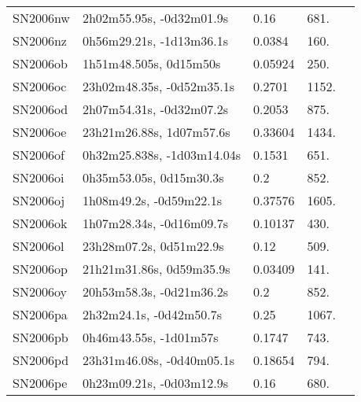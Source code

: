 \begin{longtable}{lllll}
         SN2006nw &       2h02m55.95s, -0d32m01.9s &     0.16 &           681. &    \citet{2006CBET..743A...1B} \\
         SN2006nz &       0h56m29.21s, -1d13m36.1s &   0.0384 &           160. &  \citet{2009AandA...495..707C} \\
         SN2006ob &         1h51m48.505s, 0d15m50s &  0.05924 &           250. &    \citet{2003SDSS1.C...0000:} \\
         SN2006oc &      23h02m48.35s, -0d52m35.1s &   0.2701 &          1152. &    \citet{2011ApJ...740...92G} \\
         SN2006od &       2h07m54.31s, -0d32m07.2s &   0.2053 &           875. &    \citet{2011ApJ...740...92G} \\
         SN2006oe &       23h21m26.88s, 1d07m57.6s &  0.33604 &          1434. &    \citet{2016SDSSD.C...0000:} \\
         SN2006of &     0h32m25.838s, -1d03m14.04s &   0.1531 &           651. &    \citet{2011ApJ...740...92G} \\
         SN2006oi &        0h35m53.05s, 0d15m30.3s &      0.2 &           852. &    \citet{2006CBET..745A...1B} \\
         SN2006oj &        1h08m49.2s, -0d59m22.1s &  0.37576 &          1605. &    \citet{2016SDSSD.C...0000:} \\
         SN2006ok &       1h07m28.34s, -0d16m09.7s &  0.10137 &           430. &    \citet{2016SDSSD.C...0000:} \\
         SN2006ol &        23h28m07.2s, 0d51m22.9s &     0.12 &           509. &    \citet{2006CBET..745A...1B} \\
         SN2006op &       21h21m31.86s, 0d59m35.9s &  0.03409 &           141. &    \citet{2004SDSS3.C...0000:} \\
         SN2006oy &       20h53m58.3s, -0d21m36.2s &      0.2 &           852. &    \citet{2006IAUC.8782A...1M} \\
         SN2006pa &        2h32m24.1s, -0d42m50.7s &     0.25 &          1067. &    \citet{2006IAUC.8782A...1M} \\
         SN2006pb &         0h46m43.55s, -1d01m57s &   0.1747 &           743. &    \citet{2011ApJ...740...92G} \\
         SN2006pd &      23h31m46.08s, -0d40m05.1s &  0.18654 &           794. &    \citet{2016SDSSD.C...0000:} \\
         SN2006pe &       0h23m09.21s, -0d03m12.9s &     0.16 &           680. &    \citet{2006IAUC.8782A...1M} \\

\end{longtable}
